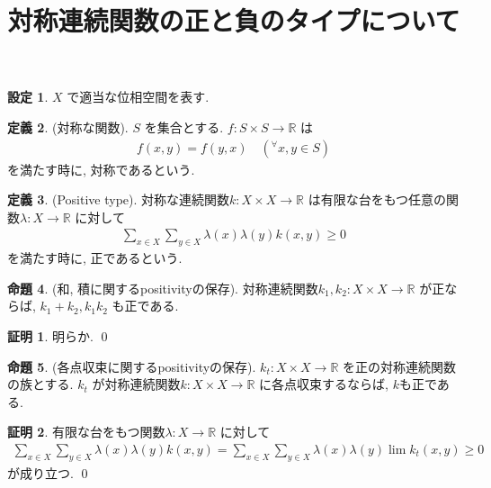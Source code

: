 \documentclass[10pt, fleqn, label-section=none]{bxjsarticle}
\title{対称連続関数の正と負のタイプについて}
\date{}
\author{}
\theoremstyle{definition}
\newtheorem{dfn}{定義}[section]
\newtheorem{prop}[dfn]{命題}
\newtheorem{setting}[dfn]{設定}
\newtheorem*{pf*}{証明}
\newcommand{\any}{{}^{\forall}}
\renewcommand{\;}{\, ; \,}
\begin{document}
\maketitle

\section{}

\begin{setting}$X$ で適当な位相空間を表す. 

\end{setting}

\begin{dfn}(対称な関数). $S$ を集合とする. $f: S \times S \rightarrow \mathbb R$ は
\begin{align*} f(x, y) = f(y, x) \quad (\any x, y \in S)\end{align*}
を満たす時に, 対称であるという. 
\end{dfn}

\begin{dfn}(Positive type). 対称な連続関数$k : X \times X \rightarrow \mathbb R$ は有限な台をもつ任意の関数$\lambda : X \rightarrow \mathbb R$ に対して
\begin{align*} \sum_{x \in X}\sum_{y \in X} \lambda(x) \lambda (y) k(x, y) \geq 0  \end{align*}
を満たす時に, 正であるという. 
\end{dfn}

\begin{prop}(和, 積に関するpositivityの保存). 対称連続関数$k_1, k_2 : X \times X \rightarrow \mathbb R$ が正ならば, $k_1 + k_2, k_1k_2$ も正である. 

\end{prop}
\begin{pf*}
明らか. 
\qed
\end{pf*}


\begin{prop}(各点収束に関するpositivityの保存). $k_t : X \times X \rightarrow \mathbb R$ を正の対称連続関数の族とする. $k_t$ が対称連続関数$k: X \times X \rightarrow \mathbb R$ に各点収束するならば, $k$も正である. 

\end{prop}
\begin{pf*}有限な台をもつ関数$\lambda : X \rightarrow \mathbb R$ に対して
\begin{align*}  \sum_{x \in X}\sum_{y \in X} \lambda(x) \lambda(y) k(x, y) =  \sum_{x \in X}\sum_{y \in X} \lambda(x) \lambda(y) \lim k_t(x, y) \geq 0  \end{align*}
が成り立つ. 
\qed
\end{pf*}
\end{document}
